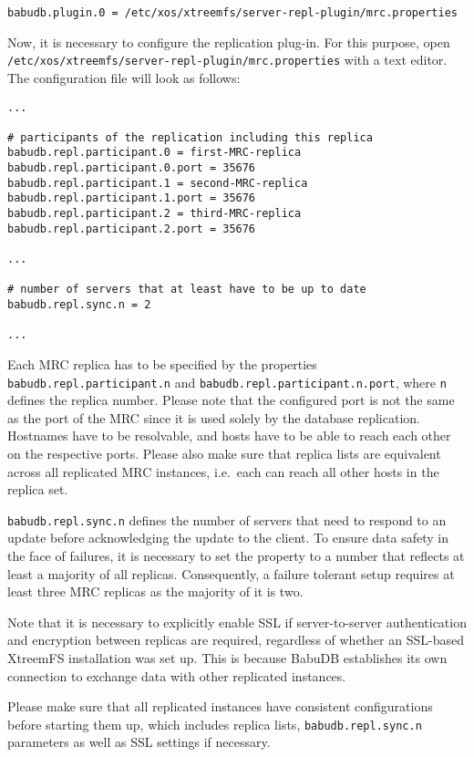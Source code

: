 \documentclass[a4paper,10pt]{book}
\begin{document}
\begin{verbatim}
babudb.plugin.0 = /etc/xos/xtreemfs/server-repl-plugin/mrc.properties
\end{verbatim}

Now, it is necessary to configure the replication plug-in. For this purpose, open \texttt{/etc/xos/xtreemfs/server-repl-plugin/mrc.properties} with a text editor. The configuration file will look as follows:

\begin{verbatim}
...

# participants of the replication including this replica
babudb.repl.participant.0 = first-MRC-replica
babudb.repl.participant.0.port = 35676
babudb.repl.participant.1 = second-MRC-replica
babudb.repl.participant.1.port = 35676
babudb.repl.participant.2 = third-MRC-replica
babudb.repl.participant.2.port = 35676

...

# number of servers that at least have to be up to date
babudb.repl.sync.n = 2

...
\end{verbatim}


Each MRC replica has to be specified by the properties \texttt{babudb.repl.participant.n} and \texttt{babudb.repl.participant.n.port}, where \texttt{n} defines the replica number. Please note that the configured port is not the same as the port of the MRC since it is used solely by the database replication. Hostnames have to be resolvable, and hosts have to be able to reach each other on the respective ports. Please also make sure that replica lists are equivalent across all replicated MRC instances, i.e.\ each can reach all other hosts in the replica set.

\texttt{babudb.repl.sync.n} defines the number of servers that need to respond to an update before acknowledging the update to the client. To ensure data safety in the face of failures, it is necessary to set the property to a number that reflects at least a majority of all replicas. Consequently, a failure tolerant setup requires at least three MRC replicas as the majority of it is two.

Note that it is necessary to explicitly enable SSL if server-to-server authentication and encryption between replicas are required, regardless of whether an SSL-based XtreemFS installation was set up. This is because BabuDB establishes its own connection to exchange data with other replicated instances.

Please make sure that all replicated instances have consistent configurations before starting them up, which includes replica lists, \texttt{babudb.repl.sync.n} parameters as well as SSL settings if necessary.
\end{document}
